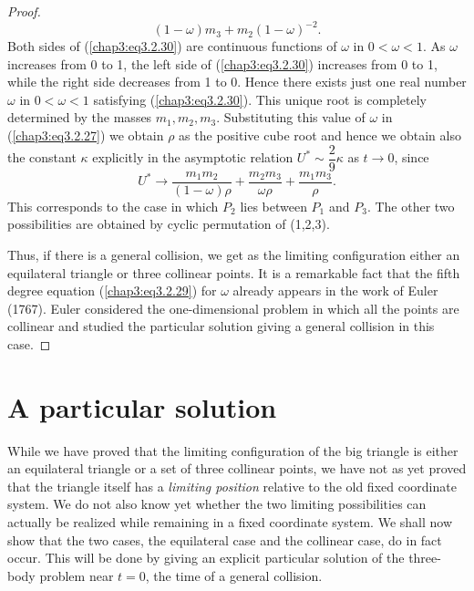 \begin{proof}
\begin{equation*}
{  (1-\omega)}{m_3 + m_2
  (1-\omega)^{-2}}. \tag{3.2.30}\label{chap3:eq3.2.30} 
\end{equation*}
Both sides of (\ref{chap3:eq3.2.30}) are continuous functions of
$\omega$ in $0 < \omega <1$. As $\omega$ increases from 0 to 1, the
left side of (\ref{chap3:eq3.2.30}) increases from 0 to 1, while the
right side decreases from 1 to 0. Hence there exists just one real
number $\omega$  in $0 < \omega <1$ satisfying
(\ref{chap3:eq3.2.30}). This unique root is completely determined by
the masses $m_1, m_2, m_3$. Substituting this value of $\omega$ in
(\ref{chap3:eq3.2.27}) we obtain $\rho$ as the positive cube root and
hence we obtain also the constant $\kappa$ explicitly in the
asymptotic relation $U^* \sim \dfrac{2}{9} \kappa$ as $t \to 0$, since  
$$
U^* \to \frac{m_1 m_2}{(1-\omega) \rho} + \frac{m_2 m_3}{\omega \rho}
+ \frac{m_1 m_3}{\rho}.  
$$\pageoriginale
This corresponds to the case in which $P_2$ lies between $P_1$ and
$P_3$. The other two possibilities are obtained by cyclic permutation
of (1,2,3). 

Thus, if there is a general collision, we get as the limiting
configuration either an equilateral triangle or three collinear
points. It is a remarkable fact that the fifth degree equation
(\ref{chap3:eq3.2.29}) for $\omega$ already appears in the work of
Euler (1767). Euler considered the one-dimensional problem in which
all the points are collinear and studied the particular solution
giving a general collision in this case. 
\end{proof}

\section{A particular solution}\label{chap3:sec3}

While we have proved that the limiting configuration of the big
triangle is either an equilateral triangle or a set of three collinear
points, we have not as yet proved that the triangle itself has a {\em
  limiting position} relative to the old fixed coordinate system. We
do not also know yet whether the two limiting possibilities can
actually be realized while remaining in a fixed coordinate system. We
shall now show that the two cases, the equilateral case and the
collinear case, do in fact occur. This will be done by giving an
explicit particular solution of the three-body problem near $t = 0$,
the time of a general collision. 

